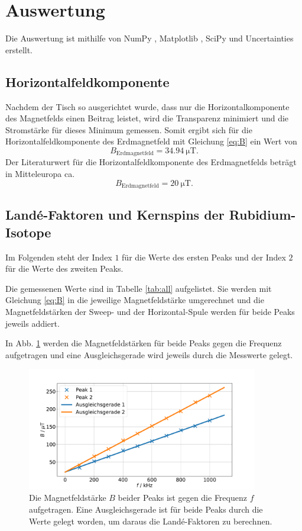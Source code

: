 \section{Auswertung}
\label{sec:Auswertung}

Die Auswertung ist mithilfe von NumPy \cite{numpy}, Matplotlib \cite{matplotlib}, SciPy \cite{scipy} und Uncertainties \cite{uncertainties} erstellt.

\subsection{Horizontalfeldkomponente}

Nachdem der Tisch so ausgerichtet wurde, dass nur die Horizontalkomponente des Magnetfelds einen Beitrag leistet, wird die Transparenz minimiert und die Stromstärke für dieses Minimum gemessen.
Somit ergibt sich für die Horizontalfeldkomponente des Erdmagnetfeld mit Gleichung \ref{eq:B} ein Wert von 
\begin{equation*}
    B_\text{Erdmagnetfeld} = \SI{34.94}{\micro\tesla}.
\end{equation*}
Der Literaturwert für die Horizontalfeldkomponente des Erdmagnetfelds beträgt in Mitteleuropa ca. 
\begin{equation*}
    B_\text{Erdmagnetfeld} = \SI{20}{\micro\tesla}.
\end{equation*}

\subsection{Landé-Faktoren und Kernspins der Rubidium-Isotope} 
Im Folgenden steht der Index $\num{1}$ für die Werte des ersten Peaks und der Index $\num{2}$ für die Werte des zweiten Peaks.

Die gemessenen Werte sind in Tabelle \ref{tab:all}
aufgelistet. Sie werden mit Gleichung \eqref{eq:B} in die jeweilige Magnetfeldstärke umgerechnet und die Magnetfeldstärken der Sweep- und der Horizontal-Spule werden für beide Peaks jeweils addiert.

In Abb. \ref{fig:plot} werden die Magnetfeldstärken für beide Peaks gegen die Frequenz aufgetragen und eine Ausgleichsgerade wird jeweils durch die Messwerte gelegt. 
\begin{figure}
    \centering
    \includegraphics[width=0.9\textwidth]{plots/fits.pdf}
    \caption{Die Magnetfeldstärke $B$ beider Peaks ist gegen die Frequenz $f$ aufgetragen. Eine Ausgleichsgerade ist für beide Peaks durch die Werte gelegt worden, um daraus die Landé-Faktoren zu berechnen.}
    \label{fig:plot}
\end{figure}

